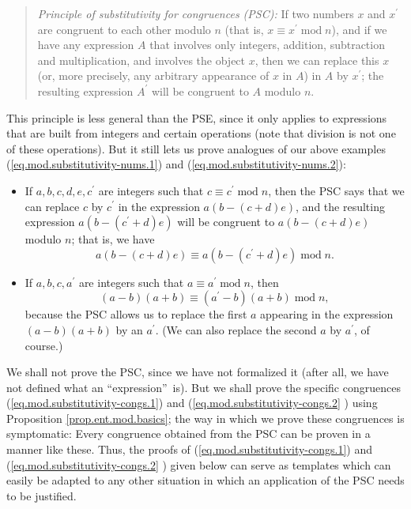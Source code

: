 \documentclass[numbers=enddot,12pt,final,onecolumn,notitlepage]{scrartcl}%
\numberwithin{exer}{subsection}
\theoremstyle{definition}
\newenvironment{statement}{\begin{quote}}{\end{quote}}
\begin{document}
\begin{statement}
\textit{Principle of substitutivity for congruences (PSC):} If two numbers $x$
and $x^{\prime}$ are congruent to each other modulo $n$ (that is, $x\equiv
x^{\prime}\operatorname{mod}n$), and if we have any expression $A$ that
involves only integers, addition, subtraction and multiplication, and involves
the object $x$, then we can replace this $x$ (or, more precisely, any
arbitrary appearance of $x$ in $A$) in $A$ by $x^{\prime}$; the resulting
expression $A^{\prime}$ will be congruent to $A$ modulo $n$.
\end{statement}

This principle is less general than the PSE, since it only applies to
expressions that are built from integers and certain operations (note that
division is not one of these operations). But it still lets us prove analogues
of our above examples (\ref{eq.mod.substitutivity-nums.1}) and
(\ref{eq.mod.substitutivity-nums.2}):

\begin{itemize}
\item If $a,b,c,d,e,c^{\prime}$ are integers such that $c\equiv c^{\prime
}\operatorname{mod}n$, then the PSC says that we can replace $c$ by
$c^{\prime}$ in the expression $a\left(  b-\left(  c+d\right)  e\right)  $,
and the resulting expression $a\left(  b-\left(  c^{\prime}+d\right)
e\right)  $ will be congruent to $a\left(  b-\left(  c+d\right)  e\right)  $
modulo $n$; that is, we have%
\begin{equation}
a\left(  b-\left(  c+d\right)  e\right)  \equiv a\left(  b-\left(  c^{\prime
}+d\right)  e\right)  \operatorname{mod}n.
\label{eq.mod.substitutivity-congs.1}%
\end{equation}


\item If $a,b,c,a^{\prime}$ are integers such that $a\equiv a^{\prime
}\operatorname{mod}n$, then
\begin{equation}
\left(  a-b\right)  \left(  a+b\right)  \equiv\left(  a^{\prime}-b\right)
\left(  a+b\right)  \operatorname{mod}n, \label{eq.mod.substitutivity-congs.2}%
\end{equation}
because the PSC allows us to replace the first $a$ appearing in the expression
$\left(  a-b\right)  \left(  a+b\right)  $ by an $a^{\prime}$. (We can also
replace the second $a$ by $a^{\prime}$, of course.)
\end{itemize}

We shall not prove the PSC, since we have not formalized it (after all, we
have not defined what an \textquotedblleft expression\textquotedblright\ is).
But we shall prove the specific congruences
(\ref{eq.mod.substitutivity-congs.1}) and (\ref{eq.mod.substitutivity-congs.2}%
) using Proposition \ref{prop.ent.mod.basics}; the way in which we prove these
congruences is symptomatic: Every congruence obtained from the PSC can be
proven in a manner like these. Thus, the proofs of
(\ref{eq.mod.substitutivity-congs.1}) and (\ref{eq.mod.substitutivity-congs.2}%
) given below can serve as templates which can easily be adapted to any other
situation in which an application of the PSC needs to be justified.
\end{document}
